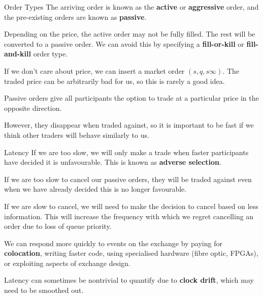 \documentclass{beamer}
\begin{document}
\begin{frame}{Order Types}
	The arriving order is known as the \textbf{active} or \textbf{aggressive} order, and the pre-existing orders are known as \textbf{passive}.%

	\pause

	Depending on the price, the active order may not be fully filled. The rest will be converted to a passive order. We can avoid this by specifying a \textbf{fill-or-kill} or \textbf{fill-and-kill} order type.

	\pause

	If we don't care about price, we can insert a market order $(s,q,s\infty)$. The traded price can be arbitrarily bad for us, so this is rarely a good idea.

	\pause

	Passive orders give all participants the option to trade at a particular price in the opposite direction.%

	However, they disappear when traded against, so it is important to be fast if we think other traders will behave similarly to us.%
\end{frame}

\begin{frame}{Latency}
	If we are too slow, we will only make a trade when faster participants have decided it is unfavourable. This is known as \textbf{adverse selection}.

	\pause

	If we are too slow to cancel our passive orders, they will be traded against even when we have already decided this is no longer favourable.

	\pause

	If we are slow to cancel, we will need to make the decision to cancel based on less information. This will increase the frequency with which we regret cancelling an order due to loss of queue priority.

	\pause

	We can respond more quickly to events on the exchange by paying for \textbf{colocation}, writing faster code, using specialised hardware (fibre optic, FPGAs), or exploiting aspects of exchange design.

	Latency can sometimes be nontrivial to quantify due to \textbf{clock drift}, which may need to be smoothed out.
\end{frame}
\end{document}
